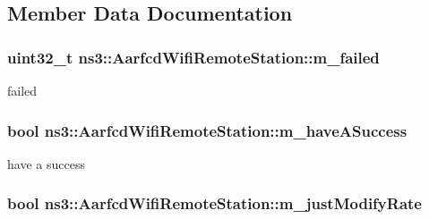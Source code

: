 \subsection{Member Data Documentation}
\subsubsection[{\texorpdfstring{m\+\_\+failed}{m_failed}}]{\setlength{\rightskip}{0pt plus 5cm}uint32\+\_\+t ns3\+::\+Aarfcd\+Wifi\+Remote\+Station\+::m\+\_\+failed}\hypertarget{structns3_1_1AarfcdWifiRemoteStation_afbf9dcfa26e918d356b28634c9cb7f19}{}\label{structns3_1_1AarfcdWifiRemoteStation_afbf9dcfa26e918d356b28634c9cb7f19}


failed 

\subsubsection[{\texorpdfstring{m\+\_\+have\+A\+Success}{m_haveASuccess}}]{\setlength{\rightskip}{0pt plus 5cm}bool ns3\+::\+Aarfcd\+Wifi\+Remote\+Station\+::m\+\_\+have\+A\+Success}\hypertarget{structns3_1_1AarfcdWifiRemoteStation_ac99619068b1b13b54283f84e20ccbad5}{}\label{structns3_1_1AarfcdWifiRemoteStation_ac99619068b1b13b54283f84e20ccbad5}


have a success 

\subsubsection[{\texorpdfstring{m\+\_\+just\+Modify\+Rate}{m_justModifyRate}}]{\setlength{\rightskip}{0pt plus 5cm}bool ns3\+::\+Aarfcd\+Wifi\+Remote\+Station\+::m\+\_\+just\+Modify\+Rate}\hypertarget{structns3_1_1AarfcdWifiRemoteStation_ad36cfb187025b2d545c01b5da781e566}{}\label{structns3_1_1AarfcdWifiRemoteStation_ad36cfb187025b2d545c01b5da781e566}


